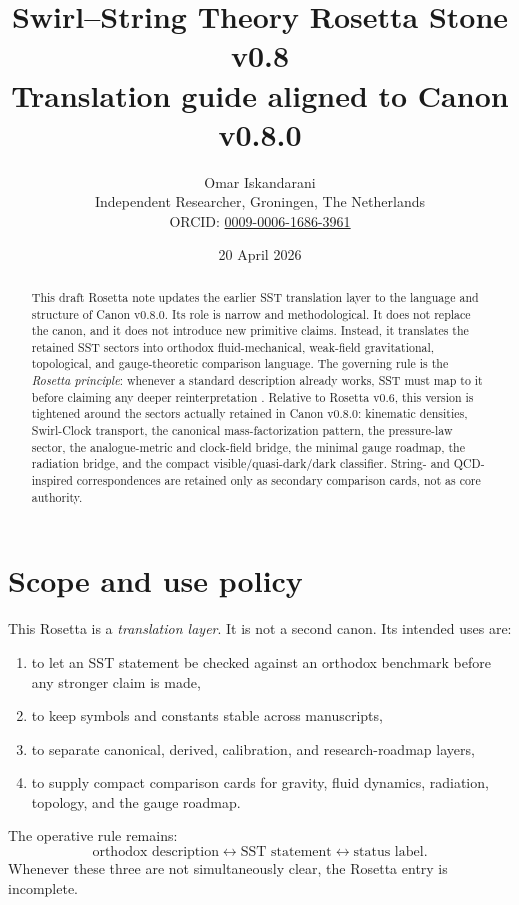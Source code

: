 \documentclass[11pt,a4paper]{article}
\title{\textbf{Swirl--String Theory Rosetta Stone v0.8}\\[2mm]
\large Translation guide aligned to Canon v0.8.0}
\author{Omar Iskandarani\\
\normalsize Independent Researcher, Groningen, The Netherlands\\
\normalsize ORCID: \href{https://orcid.org/0009-0006-1686-3961}{0009-0006-1686-3961}}
\date{20 April 2026}
\begin{document}
\maketitle

\begin{abstract}
This draft Rosetta note updates the earlier SST translation layer to the language and structure of Canon v0.8.0. Its role is narrow and methodological. It does not replace the canon, and it does not introduce new primitive claims. Instead, it translates the retained SST sectors into orthodox fluid-mechanical, weak-field gravitational, topological, and gauge-theoretic comparison language. The governing rule is the \emph{Rosetta principle}: whenever a standard description already works, SST must map to it before claiming any deeper reinterpretation \cite{SSTCanon08}. Relative to Rosetta v0.6, this version is tightened around the sectors actually retained in Canon v0.8.0: kinematic densities, Swirl-Clock transport, the canonical mass-factorization pattern, the pressure-law sector, the analogue-metric and clock-field bridge, the minimal gauge roadmap, the radiation bridge, and the compact visible/quasi-dark/dark classifier. String- and QCD-inspired correspondences are retained only as secondary comparison cards, not as core authority.\end{abstract}

\section{Scope and use policy}
This Rosetta is a \emph{translation layer}. It is not a second canon. Its intended uses are:
\begin{enumerate}
  \item to let an SST statement be checked against an orthodox benchmark before any stronger claim is made,
  \item to keep symbols and constants stable across manuscripts,
  \item to separate canonical, derived, calibration, and research-roadmap layers,
  \item to supply compact comparison cards for gravity, fluid dynamics, radiation, topology, and the gauge roadmap.
\end{enumerate}
The operative rule remains:
\[
\text{orthodox description} \longleftrightarrow \text{SST statement} \longleftrightarrow \text{status label}.
\]
Whenever these three are not simultaneously clear, the Rosetta entry is incomplete.
\end{document}
